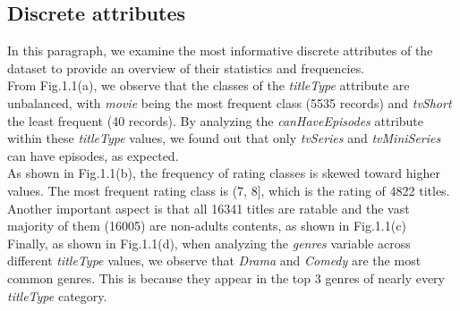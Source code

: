 \subsection{Discrete attributes}
In this paragraph, we examine the most informative discrete attributes of the dataset to provide an overview of their statistics and frequencies. 
\\From Fig.1.1(a), we observe that the classes of the \textit{titleType} attribute are unbalanced, with \textit{movie} being the most frequent class (5535 records) and \textit{tvShort} the least frequent (40 records). By analyzing the \textit{canHaveEpisodes} attribute within these \textit{titleType} values, we found out that only \textit{tvSeries} and \textit{tvMiniSeries} can have episodes, as expected.
\\As shown in Fig.1.1(b), the frequency of rating classes is skewed toward higher values. The most frequent rating class is (7, 8], which is the rating of 4822 titles.
\\Another important aspect is that all 16341 titles are ratable and the vast majority of them (16005) are non-adults contents, as shown in Fig.1.1(c)
\\Finally, as shown in Fig.1.1(d), when analyzing the \textit{genres} variable across different \textit{titleType} values, we observe that \textit{Drama} and \textit{Comedy} are the most common genres. This is because they appear in the top 3 genres of nearly every \textit{titleType} category.
